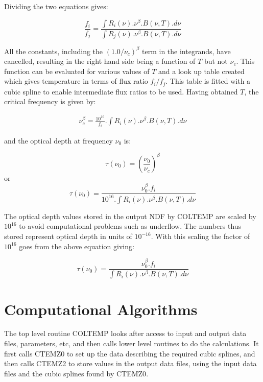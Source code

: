 Dividing the two equations gives:

\begin{equation}
\label{EQ:RAT}
\frac{f_{i}}{f_{j}} = \frac{ \int R_{i}(\nu).\nu^{\beta}.B( \nu, T ).d\nu}
{ \int R_{j}(\nu).\nu^{\beta}.B( \nu, T ).d\nu}
\end{equation}

All the constants, including the $(1.0/\nu_{c})^{\beta}$ term in the integrands,
have cancelled, resulting in the right hand side being a function of $T$ but not
$\nu_{c}$. This function can be evaluated for various values of $T$ and a look 
up table created which gives temperature in terms of flux ratio $f_{i}/f_{j}$.
This table is fitted with a cubic spline to enable intermediate flux ratios to 
be used. Having obtained $T$, the critical frequency is given by:

\begin{eqnarray*}
\nu_c^{\beta} = \frac{10^{16}}{f_{i}}.\int R_{i}(\nu).\nu^{\beta}.B( \nu, T ).d\nu
\end{eqnarray*}

and the optical depth at frequency $\nu_{0}$ is:

\begin{equation}
\label{EQ:TAUN}
\tau(\nu_{0}) = \left(\frac{\nu_{0}}{\nu_{c} }\right)^{\beta}
\end{equation}
or
\begin{equation}
\tau(\nu_{0}) = \frac{\nu_{0}^{\beta}.f_{i}}{10^{16}.\int R_{i}(\nu).\nu^{\beta}.B( \nu, T ).d\nu}
\end{equation}

The optical depth values stored in the output {\small NDF} by {\small COLTEMP} 
are scaled by $10^{16}$ to avoid computational problems such as underflow. The 
numbers thus stored represent optical depth in units of $10^{-16}$. With this 
scaling the factor of $10^{16}$ goes from the above equation giving:

\begin{equation}
\label {EQ:TAU}
\tau(\nu_{0}) = \frac{\nu_{0}^{\beta}.f_{i}}{\int R_{i}(\nu).\nu^{\beta}.B( \nu, T ).d\nu}
\end{equation}

\section{Computational Algorithms}
The top level routine {\small COLTEMP} looks after access to input and output
data files, parameters, etc, and then calls lower level routines to do the
calculations. It first calls {\small CTEMZ0} to set up the data describing the
required cubic splines, and then calls {\small CTEMZ2} to store values in the
output data files, using the input data files and the cubic splines found by
{\small CTEMZ0}. 

